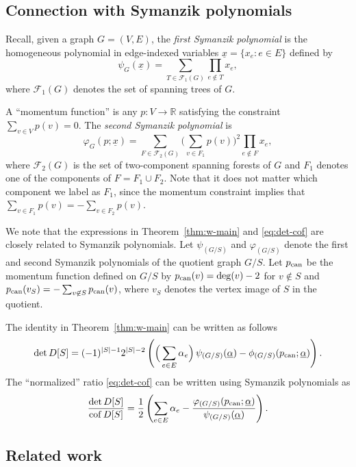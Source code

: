 \documentclass[12pt]{amsart}
\theoremstyle{definition}
\newcommand{\RR}{\mathbb{R}}
\DeclareMathOperator{\cof}{cof}
\newcommand{\trees}{\mathcal{F}_1}
\newcommand{\forests}{\mathcal{F}}
\begin{document}
\subsection{Connection with Symanzik polynomials}\label{sec:symanzik}
Recall, given a graph $G = (V, E)$, the {\em first Symanzik polynomial} is the homogeneous polynomial in edge-indexed variables $\underline{x} = \{x_e \colon e \in E\}$ defined by
\[
	\psi_G(\underline{x}) = \sum_{T \in \trees(G)} \prod_{e \not \in T} x_e ,
\]
where $\trees(G)$ denotes the set of spanning trees of $G$.

A ``momentum function'' is any $p\colon V \to \RR$ satisfying the constraint $\sum_{v \in V} p(v) = 0$. 
The {\em second Symanzik polynomial} is
\[
	\varphi_G(p; \underline{x}) = \sum_{F \in \forests_2(G)} \Big(\sum_{v \in F_1} p(v) \Big)^2 \prod_{e \not\in F} x_e ,
\]
where $\forests_2(G)$ is the set of two-component spanning forests of $G$ and $F_1$ denotes one of the components of $F = F_1 \cup F_2$.
Note that it does not matter which component we label as $F_1$, since the momentum constraint implies that
$\sum_{v \in F_1} p(v)  = - \sum_{v \in F_2} p(v)$.


We note that the expressions in Theorem~\ref{thm:w-main} and \eqref{eq:det-cof} are closely related to Symanzik polynomials.
Let $\psi_{(G/S)}$ and $\varphi_{(G/S)}$ denote the first and second Symanzik polynomials of the quotient graph $G/S$.
Let $p_{\rm can}$ be the momentum function defined on $G/S$ by $p_{\rm can}(v) = \deg(v) - 2$ for $v \not \in S$ and $p_{\rm can}(v_S) = -\sum_{v \not\in S} p_{\rm can}(v)$, where $v_S$ denotes the vertex image of $S$ in the quotient.

The identity in Theorem~\ref{thm:w-main} can be written as follows
\begin{equation}
\label{eq:det-symanzik}
	\det D[S] = (-1)^{|S|-1} 2^{|S|-2} \left( \Big(\sum_{e \in E}\alpha_e \Big)\, \psi_{(G/S)}(\underline{\alpha}) - \phi_{(G/S)}(p_{\rm can}; \underline{\alpha}) \right) .
\end{equation}
The ``normalized'' ratio \eqref{eq:det-cof} can be written using Symanzik polynomials as
\begin{equation}\label{eq:det-cof-symanzik}
	\frac{\det D[S]}{\cof D[S]} = \frac12 \left( \sum_{e \in E} \alpha_e - \frac{\varphi_{(G/S)}(p_{\rm can}; \underline{\alpha})}{\psi_{(G/S)}(\underline{\alpha})} \right) .
\end{equation}

\subsection{Related work}
\end{document}

